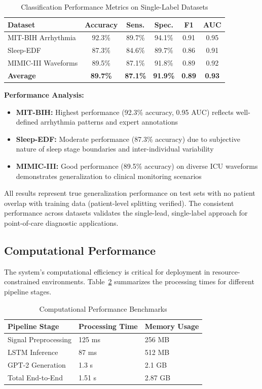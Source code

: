 \documentclass[conference]{IEEEtran}
\begin{document}
\begin{table}[htbp]
\caption{Classification Performance Metrics on Single-Label Datasets}
\label{tab:performance}
\centering
\begin{tabular}{lccccc}
\toprule
Dataset & Accuracy & Sens. & Spec. & F1 & AUC \\
\midrule
MIT-BIH Arrhythmia & 92.3\% & 89.7\% & 94.1\% & 0.91 & 0.95 \\
Sleep-EDF & 87.3\% & 84.6\% & 89.7\% & 0.86 & 0.91 \\
MIMIC-III Waveforms & 89.5\% & 87.1\% & 91.8\% & 0.89 & 0.92 \\
\midrule
\textbf{Average} & \textbf{89.7\%} & \textbf{87.1\%} & \textbf{91.9\%} & \textbf{0.89} & \textbf{0.93} \\
\bottomrule
\end{tabular}
\end{table}

\textbf{Performance Analysis:}
\begin{itemize}
\item \textbf{MIT-BIH:} Highest performance (92.3\% accuracy, 0.95 AUC) reflects well-defined arrhythmia patterns and expert annotations
\item \textbf{Sleep-EDF:} Moderate performance (87.3\% accuracy) due to subjective nature of sleep stage boundaries and inter-individual variability
\item \textbf{MIMIC-III:} Good performance (89.5\% accuracy) on diverse ICU waveforms demonstrates generalization to clinical monitoring scenarios
\end{itemize}

All results represent true generalization performance on test sets with no patient overlap with training data (patient-level splitting verified). The consistent performance across datasets validates the single-lead, single-label approach for point-of-care diagnostic applications.

\subsection{Computational Performance}

The system's computational efficiency is critical for deployment in resource-constrained environments. Table~\ref{tab:computational} summarizes the processing times for different pipeline stages.

\begin{table}[htbp]
\caption{Computational Performance Benchmarks}
\label{tab:computational}
\centering
\begin{tabular}{lll}
\toprule
Pipeline Stage & Processing Time & Memory Usage \\
\midrule
Signal Preprocessing & 125 ms & 256 MB \\
LSTM Inference & 87 ms & 512 MB \\
GPT-2 Generation & 1.3 s & 2.1 GB \\
Total End-to-End & 1.51 s & 2.87 GB \\
\bottomrule
\end{tabular}
\end{table}
\end{document}
